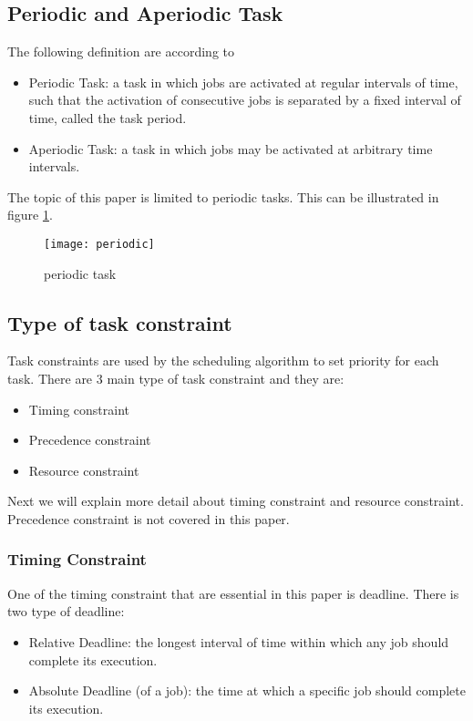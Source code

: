 \subsection{Periodic and Aperiodic Task}

The following definition are according to \cite{b4}
\begin{itemize}
\item Periodic Task: a task in which jobs are activated at regular intervals of time, such that the activation of consecutive jobs is separated by a fixed interval of time, called the task period.
\item Aperiodic Task: a task in which jobs may be activated at arbitrary time intervals.
\end{itemize}

The topic of this paper is limited to periodic tasks. This can be illustrated in figure \ref{fig:periodic}.

\begin{figure}[h]
    \centering
    \texttt{[image: periodic]}
    \caption{periodic task \cite{b5}}
    \label{fig:periodic}
\end{figure}

\subsection{Type of task constraint}

Task constraints are used by the scheduling algorithm to set  priority for each task. There are 3 main type of task constraint and they are:

\begin{itemize}
\item Timing constraint
\item Precedence constraint
\item Resource constraint
\end{itemize}

Next we will explain more detail about timing constraint and resource constraint. Precedence constraint is not covered in this paper. 

\subsubsection{Timing Constraint}

One of the timing constraint that are essential in this paper is deadline. There is two type of deadline:
\begin{itemize}
\item Relative Deadline: the longest interval of time within which any job should complete its execution\cite{b4}.
\item Absolute Deadline (of a job): the time at which a specific job should complete its execution\cite{b4}.
\end{itemize}

